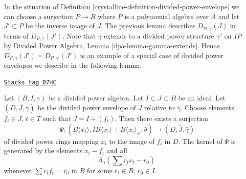 In the situation of Definition \ref{crystalline-definition-divided-power-envelope}
we can choose a surjection $P \to B$ where $P$ is a polynomial
algebra over $A$ and let $J' \subset P$ be the inverse image of $J$.
The previous lemma describes $D_{B, \gamma}(J)$ in terms of
$D_{P, \gamma}(J')$. Note that $\gamma$ extends to a divided power
structure $\gamma'$ on $IP$ by
Divided Power Algebra, Lemma \ref{dpa-lemma-gamma-extends}. Hence
$D_{P, \gamma}(J') = D_{P, \gamma'}(J')$ is an example of a special
case of divided power envelopes we describe in the following lemma.

\begin{lemma}
\label{crystalline-lemma-describe-divided-power-envelope}
\href{https://stacks.math.columbia.edu/tag/07HC}{\texttt{Stacks tag 07HC}}

Let $(B, I, \gamma)$ be a divided power algebra. Let $I \subset J \subset B$
be an ideal. Let $(D, \bar J, \bar \gamma)$ be the divided power envelope
of $J$ relative to $\gamma$. Choose elements $f_t \in J$, $t \in T$ such
that $J = I + (f_t)$. Then there exists a surjection
$$
\Psi :
(B\langle x_t \rangle, IB\langle x_t \rangle + B\langle x_t \rangle_+, \delta)
\longrightarrow
(D, \bar J, \bar \gamma)
$$
of divided power rings mapping $x_t$ to the image of $f_t$ in $D$.
The kernel of $\Psi$ is generated by the elements $x_t - f_t$ and
all
$$
\delta_n\left(\sum r_t x_t - r_0\right)
$$
whenever $\sum r_t f_t = r_0$ in $B$ for some $r_t \in B$, $r_0 \in I$.
\end{lemma}

